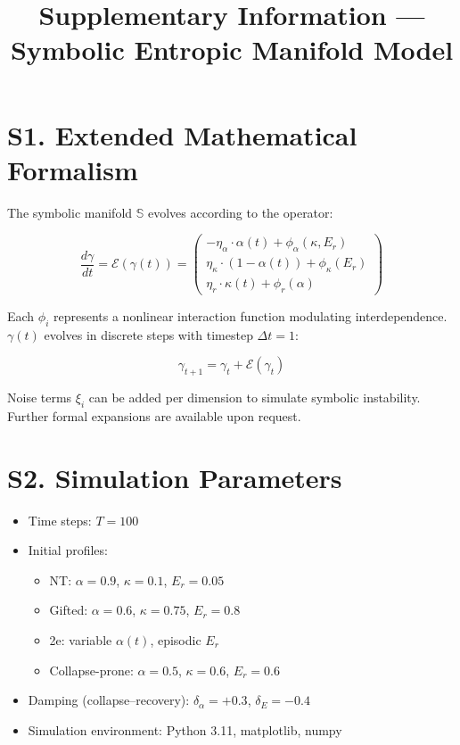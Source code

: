 \documentclass[12pt]{article}
\title{Supplementary Information — Symbolic Entropic Manifold Model}
\date{}
\begin{document}
\maketitle

\section*{S1. Extended Mathematical Formalism}

The symbolic manifold $\mathbb{S}$ evolves according to the operator:

\[
\frac{d\gamma}{dt} = \mathcal{E}(\gamma(t)) = 
\begin{pmatrix}
    -\eta_\alpha \cdot \alpha(t) + \phi_\alpha(\kappa,E_r) \\
    \eta_\kappa \cdot (1 - \alpha(t)) + \phi_\kappa(E_r) \\
    \eta_r \cdot \kappa(t) + \phi_r(\alpha)
\end{pmatrix}
\]

Each $\phi_i$ represents a nonlinear interaction function modulating interdependence. $\gamma(t)$ evolves in discrete steps with timestep $\Delta t = 1$:

\[
\gamma_{t+1} = \gamma_t + \mathcal{E}(\gamma_t)
\]

Noise terms $\xi_i$ can be added per dimension to simulate symbolic instability. Further formal expansions are available upon request.

\section*{S2. Simulation Parameters}

\begin{itemize}
    \item Time steps: $T = 100$
    \item Initial profiles:
    \begin{itemize}
        \item NT: $\alpha=0.9$, $\kappa=0.1$, $E_r=0.05$
        \item Gifted: $\alpha=0.6$, $\kappa=0.75$, $E_r=0.8$
        \item 2e: variable $\alpha(t)$, episodic $E_r$
        \item Collapse-prone: $\alpha=0.5$, $\kappa=0.6$, $E_r=0.6$
    \end{itemize}
    \item Damping (collapse--recovery): $\delta_\alpha = +0.3$, $\delta_E = -0.4$
    \item Simulation environment: Python 3.11, matplotlib, numpy
\end{itemize}
\end{document}
